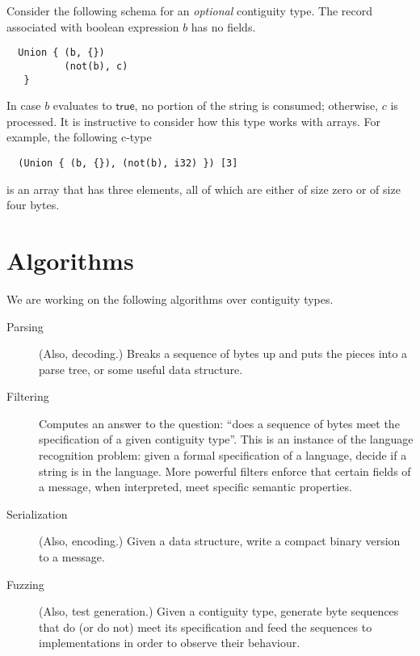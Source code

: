 \documentclass[svgnames]{llncs}
\newcommand{\konst}[1]{\ensuremath{\mathsf{#1}}}
\begin{document}
\begin{example}
Consider the following schema for an \emph{optional} contiguity
type. The record associated with boolean expression $b$ has no fields.

\begin{verbatim}
  Union { (b, {})
          (not(b), c)
   }
\end{verbatim}

In case $\mathit{b}$ evaluates to \konst{true}, no portion of the
string is consumed; otherwise, $c$ is processed. It is instructive to
consider how this type works with arrays. For example, the following
c-type

\begin{verbatim}
  (Union { (b, {}), (not(b), i32) }) [3]
\end{verbatim}

is an array that has three elements, all of which are either of size
zero or of size four bytes.

\end{example}

\section{Algorithms}

We are working on the following algorithms over contiguity types.

\begin{description}

\item [Parsing] (Also, decoding.) Breaks a sequence of bytes up and puts the
  pieces into a parse tree, or some useful data structure.

\item [Filtering] Computes an answer to the question: ``does a
  sequence of bytes meet the specification of a given contiguity
  type''. This is an instance of the language recognition problem:
  given a formal specification of a language, decide if a string is in
  the language. More powerful filters enforce that certain fields of a
  message, when interpreted, meet specific semantic properties.

\item [Serialization] (Also, encoding.) Given a data structure, write a compact
  binary version to a message.

\item [Fuzzing] (Also, test generation.) Given a contiguity type, generate
  byte sequences that do (or do not) meet its specification and feed
  the sequences to implementations in order to observe their behaviour.

\end{description}
\end{document}
